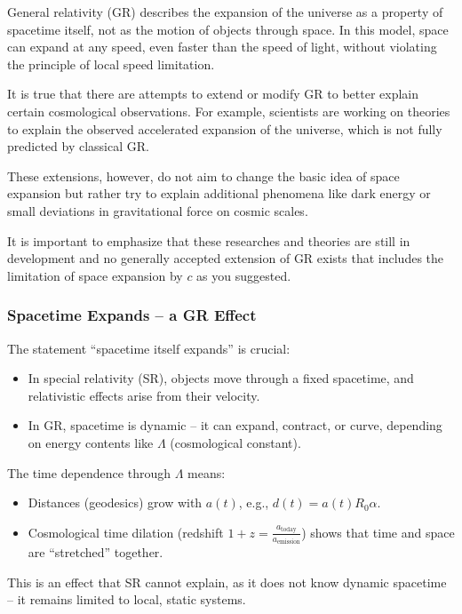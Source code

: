 \documentclass[a4paper,12pt]{article}
\begin{document}
	General relativity (GR) describes the expansion of the universe as a property of spacetime itself, not as the motion of objects through space. In this model, space can expand at any speed, even faster than the speed of light, without violating the principle of local speed limitation.
	
	It is true that there are attempts to extend or modify GR to better explain certain cosmological observations. For example, scientists are working on theories to explain the observed accelerated expansion of the universe, which is not fully predicted by classical GR.
	
	These extensions, however, do not aim to change the basic idea of space expansion but rather try to explain additional phenomena like dark energy or small deviations in gravitational force on cosmic scales.
	
	It is important to emphasize that these researches and theories are still in development and no generally accepted extension of GR exists that includes the limitation of space expansion by \( c \) as you suggested.
	
	\subsubsection{Spacetime Expands – a GR Effect}
	The statement ``spacetime itself expands'' is crucial:
	\begin{itemize}
		\item In special relativity (SR), objects move through a fixed spacetime, and relativistic effects arise from their velocity.
		\item In GR, spacetime is dynamic – it can expand, contract, or curve, depending on energy contents like \( \Lambda \) (cosmological constant).
	\end{itemize}
	
	The time dependence through \( \Lambda \) means:
	\begin{itemize}
		\item Distances (geodesics) grow with \( a(t) \), e.g., \( d(t) = a(t) R_0 \alpha \).
		\item Cosmological time dilation (redshift \( 1 + z = \frac{a_{\text{today}}}{a_{\text{emission}}} \)) shows that time and space are ``stretched'' together.
	\end{itemize}
	
	This is an effect that SR cannot explain, as it does not know dynamic spacetime – it remains limited to local, static systems.
	
\end{document}
